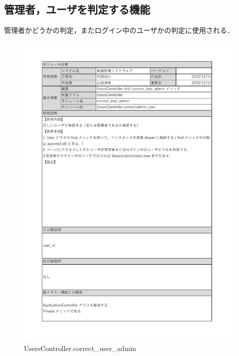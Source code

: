 \subsection*{管理者，ユーザを判定する機能}
管理者かどうかの判定，またログイン中のユーザかの判定に使用される．
\begin{figure}[H]
    \centering
    \includegraphics[scale=0.5]{img/Method/UsersController_correct_user_admin.pdf}
    \caption{UsersController.correct\_user\_admin}
\end{figure}
\clearpage

